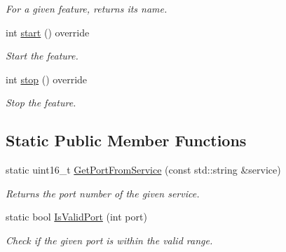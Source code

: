 \begin{DoxyCompactItemize}
\begin{DoxyCompactList}\small\item\em For a given feature, returns its name. \end{DoxyCompactList}\item 
int \hyperlink{class_aws_1_1_iot_1_1_device_client_1_1_secure_tunneling_1_1_secure_tunneling_feature_a9e33fc786883e519e587f7d89f2a9086}{start} () override
\begin{DoxyCompactList}\small\item\em Start the feature. \end{DoxyCompactList}\item 
int \hyperlink{class_aws_1_1_iot_1_1_device_client_1_1_secure_tunneling_1_1_secure_tunneling_feature_a9cd3840b50bd1f62537df3354c7d2fbf}{stop} () override
\begin{DoxyCompactList}\small\item\em Stop the feature. \end{DoxyCompactList}\end{DoxyCompactItemize}
\subsection*{Static Public Member Functions}
\begin{DoxyCompactItemize}
\item 
static uint16\+\_\+t \hyperlink{class_aws_1_1_iot_1_1_device_client_1_1_secure_tunneling_1_1_secure_tunneling_feature_af9e304cd7e3eb06cd2358b3e9fe838c0}{Get\+Port\+From\+Service} (const std\+::string \&service)
\begin{DoxyCompactList}\small\item\em Returns the port number of the given service. \end{DoxyCompactList}\item 
static bool \hyperlink{class_aws_1_1_iot_1_1_device_client_1_1_secure_tunneling_1_1_secure_tunneling_feature_a40e54cf67d52c08f73d8b5486e846bac}{Is\+Valid\+Port} (int port)
\begin{DoxyCompactList}\small\item\em Check if the given port is within the valid range. \end{DoxyCompactList}\end{DoxyCompactItemize}
